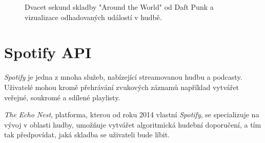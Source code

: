 \documentclass[thesis=B, czech]{FITthesis}[2019/03/06]
\begin{document}
\begin{figure}[t]
\def\svgwidth{0.9\textwidth}
    \centering
  \captionsetup{justification=centering}
    
        \caption[Znázornění \textit{Spotify API} intervalů ve skladbě.]{
        Dvacet sekund skladby "Around the World" od Daft Punk a vizualizace odhadovaných událostí v hudbě.}
    \label{fig:spotify}
\end{figure}


\section{Spotify API}
\label{spotify}

\textit{Spotify} je jedna z mnoha služeb, nabízející streamovanou hudbu a podcasty. Uživatelé mohou kromě přehrávání zvukových záznamů například vytvářet veřejné, soukromé a sdílené playlisty.

\textit{The Echo Nest}, platforma, kterou od roku 2014 vlastní \textit{Spotify}, se specializuje na vývoj v oblasti hudby, umožňuje vytvářet algoritmická hudební doporučení, a tím tak předpovídat, jaká skladba se uživateli bude líbit. 









\end{document}
